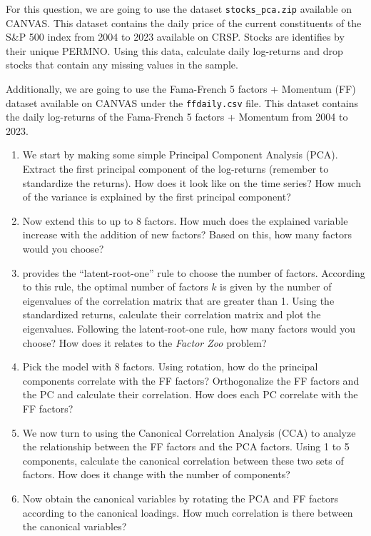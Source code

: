 For this question, we are going to use the dataset \texttt{stocks\_pca.zip} available on CANVAS. This dataset contains the daily price of the current constituents of the S\&P 500 index from 2004 to 2023 available on CRSP. Stocks are identifies by their unique PERMNO. Using this data, calculate daily log-returns and drop stocks that contain any missing values in the sample.

Additionally, we are going to use the Fama-French 5 factors + Momentum (FF) dataset available on CANVAS under the \texttt{ffdaily.csv} file. This dataset contains the daily log-returns of the Fama-French 5 factors + Momentum from 2004 to 2023.

\begin{enumerate}[label = \textbf{\Alph*)}]
    \item We start by making some simple Principal Component Analysis (PCA). Extract the first principal component of the log-returns (remember to standardize the returns). How does it look like on the time series? How much of the variance is explained by the first principal component?
    \item Now extend this to up to 8 factors. How much does the explained variable increase with the addition of new factors? Based on this, how many factors would you choose?
    \item \citet{horn1965rationale} provides the ``latent-root-one'' rule to choose the number of factors. According to this rule, the optimal number of factors \(k\) is given by the number of eigenvalues of the correlation matrix that are greater than 1. Using the standardized returns, calculate their correlation matrix and plot the eigenvalues. Following the latent-root-one rule, how many factors would you choose? How does it relates to the \textit{Factor Zoo} problem?
    \item Pick the model with 8 factors. Using rotation, how do the principal components correlate with the FF factors? Orthogonalize the FF factors and the PC and calculate their correlation. How does each PC correlate with the FF factors?
    \item We now turn to using the Canonical Correlation Analysis (CCA) to analyze the relationship between the FF factors and the PCA factors. Using 1 to 5 components, calculate the canonical correlation between these two sets of factors. How does it change with the number of components?
    \item Now obtain the canonical variables by rotating the PCA and FF factors according to the canonical loadings. How much correlation is there between the canonical variables?
\end{enumerate}